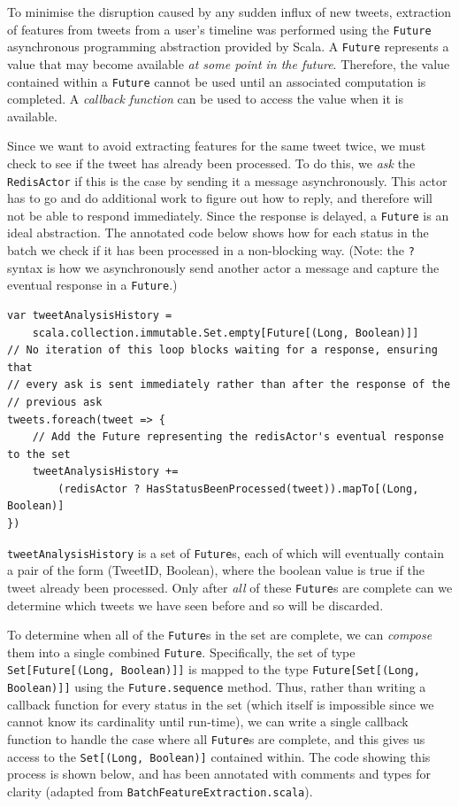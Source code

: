 \documentclass{l4proj}
\newcommand{\code}[1]{\texttt{#1}}
\begin{document}
        To minimise the disruption caused by any sudden influx of new tweets, extraction of features from tweets from a user's timeline was performed using the \code{Future} asynchronous programming abstraction provided by Scala. A \code{Future} represents a value that may become available \textit{at some point in the future}. Therefore, the value contained within a \code{Future} cannot be used until an associated computation is completed. A \textit{callback function} can be used to access the value when it is available.
        
        Since we want to avoid extracting features for the same tweet twice, we must check to see if the tweet has already been processed. To do this, we \textit{ask} the \code{RedisActor} if this is the case by sending it a message asynchronously. This actor has to go and do additional work to figure out how to reply, and therefore will not be able to respond immediately. Since the response is delayed, a \code{Future} is an ideal abstraction. The annotated code below shows how for each status in the batch we check if it has been processed in a non-blocking way. (Note: the \code{?} syntax is how we asynchronously send another actor a message and capture the eventual response in a \code{Future}.)
        
\begin{lstlisting}[caption=Check asynchronously whether a status has already been processed.]
var tweetAnalysisHistory = 
    scala.collection.immutable.Set.empty[Future[(Long, Boolean)]]
// No iteration of this loop blocks waiting for a response, ensuring that
// every ask is sent immediately rather than after the response of the 
// previous ask
tweets.foreach(tweet => {
    // Add the Future representing the redisActor's eventual response to the set
    tweetAnalysisHistory += 
        (redisActor ? HasStatusBeenProcessed(tweet)).mapTo[(Long, Boolean)]
})
\end{lstlisting}
        
\code{tweetAnalysisHistory} is a set of \code{Future}s, each of which will eventually contain a pair of the form (TweetID, Boolean), where the boolean value is true if the tweet already been processed. Only after \textit{all} of these \code{Future}s are complete can we determine which tweets we have seen before and so will be discarded.

To determine when all of the \code{Future}s in the set are complete, we can \textit{compose} them into a single combined \code{Future}. Specifically, the set of type \code{Set[Future[(Long, Boolean)]]} is mapped to the type \code{Future[Set[(Long, Boolean)]]} using the \code{Future.sequence} method. Thus, rather than writing a callback function for every status in the set (which itself is impossible since we cannot know its cardinality until run-time), we can write a single callback function to handle the case where all \code{Future}s are complete, and this gives us access to the \code{Set[(Long, Boolean)]} contained within. The code showing this process is shown below, and has been annotated with comments and types for clarity (adapted from  \code{BatchFeatureExtraction.scala}).
\end{document}
